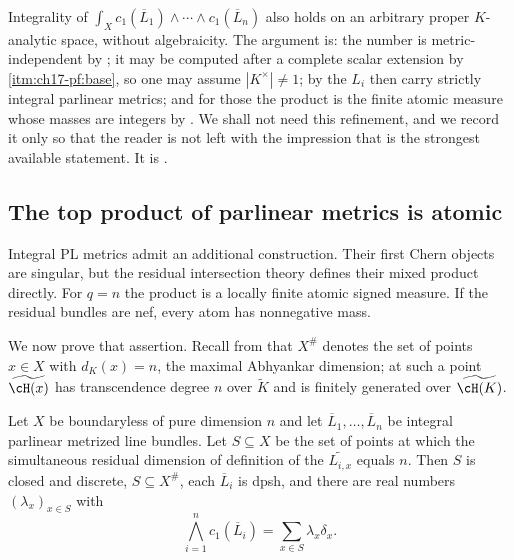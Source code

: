 \begin{remark}
\label{rem:ch17-integrality-analytic}
Integrality of $\int_Xc_1(\overline L_1)\wedge\cdots\wedge
c_1(\overline L_n)$ also holds on an arbitrary proper $K$-analytic space,
without algebraicity.  The argument is: the number is metric-independent by
; it may be computed after a complete
scalar extension by
\,\cref{itm:ch17-pf:base}, so one may
assume $|K^\times|\ne1$; by
 the $L_i$ then carry strictly integral
parlinear metrics; and for those the product is the finite atomic measure
 whose masses are integers by
.  We shall not need this refinement, and we
record it only so that the reader is not left with the impression that
 is the strongest available statement.  It is
\cite[Corollary~18.4.10]{CLD25}.
\end{remark}

\subsection{The top product of parlinear metrics is atomic}
\label{sec:ch17-atomic}

Integral PL metrics admit an additional construction.  Their first Chern
objects are singular, but the residual intersection theory defines their
mixed product directly.  For $q=n$ the product is a locally finite atomic
signed measure.  If the residual bundles are nef, every atom has
nonnegative mass.

We now prove that assertion.  Recall from 
that $X^{\#}$ denotes the set of points $x\in X$ with
$d_K(x)=n$, the maximal Abhyankar dimension; at such a point
$\widetilde{\cH(x)}$ has transcendence degree $n$ over $\widetilde K$
and is finitely generated over $\widetilde{\cH(K)}$.

\begin{theorem}
\label{thm:ch17-atomic-support}
Let $X$ be boundaryless of pure dimension $n$ and let
$\overline L_1,\dots,\overline L_n$ be integral parlinear metrized line
bundles.  Let $S\subseteq X$ be the set of points at which the
simultaneous residual dimension of definition of the
$\widetilde{L_{i,x}}$ equals $n$.  Then $S$ is closed and discrete,
$S\subseteq X^{\#}$, each $\overline L_i$ is dpsh, and there are real
numbers $(\lambda_x)_{x\in S}$ with
\[
 \bigwedge_{i=1}^nc_1(\overline L_i)=\sum_{x\in S}\lambda_x\delta_x.
\]
\end{theorem}

